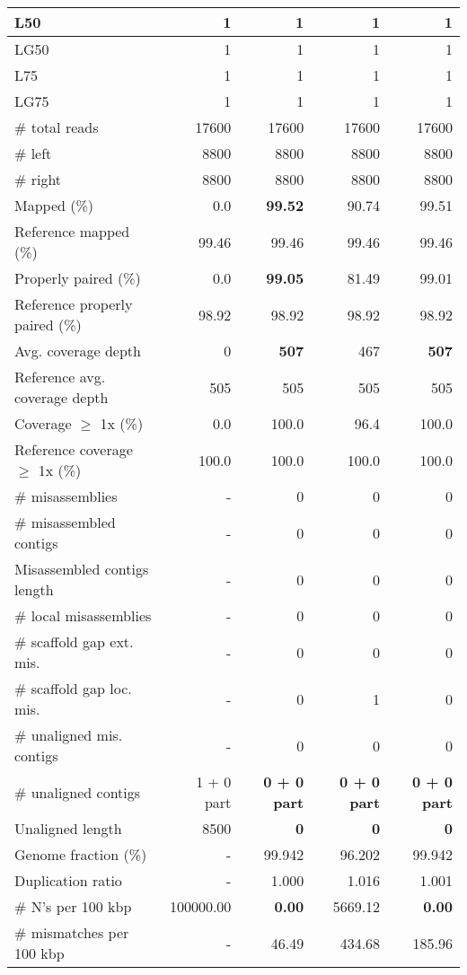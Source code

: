 \documentclass[12pt,a4paper]{article}
\begin{document}
\begin{table}[ht]
\begin{center}
\begin{tabular}{|l*{4}{|r}|}
L50 & 1 & 1 & 1 & 1 \\ \hline
LG50 & 1 & 1 & 1 & 1 \\ \hline
L75 & 1 & 1 & 1 & 1 \\ \hline
LG75 & 1 & 1 & 1 & 1 \\ \hline
\# total reads & 17600 & 17600 & 17600 & 17600 \\ \hline
\# left & 8800 & 8800 & 8800 & 8800 \\ \hline
\# right & 8800 & 8800 & 8800 & 8800 \\ \hline
Mapped (\%) & 0.0 & {\bf 99.52} & 90.74 & 99.51 \\ \hline
Reference mapped (\%) & 99.46 & 99.46 & 99.46 & 99.46 \\ \hline
Properly paired (\%) & 0.0 & {\bf 99.05} & 81.49 & 99.01 \\ \hline
Reference properly paired (\%) & 98.92 & 98.92 & 98.92 & 98.92 \\ \hline
Avg. coverage depth & 0 & {\bf 507} & 467 & {\bf 507} \\ \hline
Reference avg. coverage depth & 505 & 505 & 505 & 505 \\ \hline
Coverage $\geq$ 1x (\%) & 0.0 & 100.0 & 96.4 & 100.0 \\ \hline
Reference coverage $\geq$ 1x (\%) & 100.0 & 100.0 & 100.0 & 100.0 \\ \hline
\# misassemblies & - & 0 & 0 & 0 \\ \hline
\# misassembled contigs & - & 0 & 0 & 0 \\ \hline
Misassembled contigs length & - & 0 & 0 & 0 \\ \hline
\# local misassemblies & - & 0 & 0 & 0 \\ \hline
\# scaffold gap ext. mis. & - & 0 & 0 & 0 \\ \hline
\# scaffold gap loc. mis. & - & 0 & 1 & 0 \\ \hline
\# unaligned mis. contigs & - & 0 & 0 & 0 \\ \hline
\# unaligned contigs & 1 + 0 part & {\bf 0 + 0 part} & {\bf 0 + 0 part} & {\bf 0 + 0 part} \\ \hline
Unaligned length & 8500 & {\bf 0} & {\bf 0} & {\bf 0} \\ \hline
Genome fraction (\%) & - & 99.942 & 96.202 & 99.942 \\ \hline
Duplication ratio & - & 1.000 & 1.016 & 1.001 \\ \hline
\# N's per 100 kbp & 100000.00 & {\bf 0.00} & 5669.12 & {\bf 0.00} \\ \hline
\# mismatches per 100 kbp & - & 46.49 & 434.68 & 185.96 \\ \hline

\end{tabular}
\end{center}
\end{table}
\end{document}
